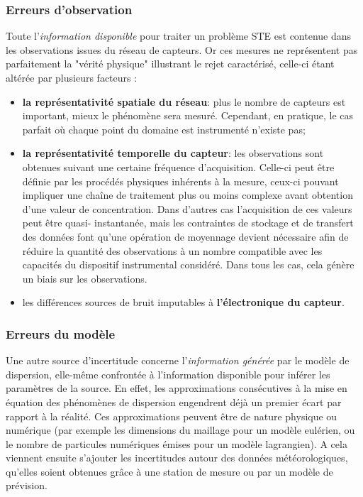 	
	\subsubsection{Erreurs d'observation}
	Toute l'\textit{information disponible} pour traiter un problème STE est {contenue} dans les observations issues du réseau de capteurs. Or ces mesures ne représentent pas parfaitement la "vérité physique" illustrant le rejet caractérisé, celle-ci étant altérée par plusieurs facteurs : \\
	
	\begin{itemize}
		\item \textbf{la représentativité spatiale du réseau}: plus le nombre de capteurs est important, mieux le phénomène sera mesuré. Cependant, en pratique, le cas parfait où chaque point du domaine est instrumenté n'existe pas;
		\item \textbf{la représentativité temporelle du capteur}: les observations sont obtenues suivant une certaine fréquence d'acquisition. Celle-ci peut être définie par les procédés physiques inhérents à la mesure, ceux-ci pouvant impliquer une chaîne de traitement plus ou moins complexe avant obtention d'une valeur de concentration. Dans d'autres cas l'acquisition de ces valeurs peut être quasi- instantanée, mais les contraintes de stockage et de transfert des données font qu'une opération de moyennage devient nécessaire afin de réduire la quantité des observations à un nombre compatible avec les capacités du dispositif instrumental considéré. Dans tous les cas, cela génère un biais sur les observations.
		\item les différences sources de bruit imputables à \textbf{l'électronique du capteur}.\\
	\end{itemize}
	
	\subsubsection{Erreurs du modèle}
	Une autre source d'incertitude concerne l'\textit{information générée} par le modèle de dispersion, elle-même confrontée à l'information disponible pour inférer les paramètres de la source. En effet, les approximations consécutives à la mise en équation des phénomènes de dispersion engendrent déjà un premier écart par rapport à la réalité. Ces approximations peuvent être de nature physique ou numérique (par exemple les dimensions du maillage pour un modèle eulérien, ou le nombre de particules numériques émises pour un modèle lagrangien). A cela viennent ensuite s'ajouter les incertitudes autour des données météorologiques, qu'elles soient obtenues grâce à une station de mesure ou par un modèle de prévision. \\
	
